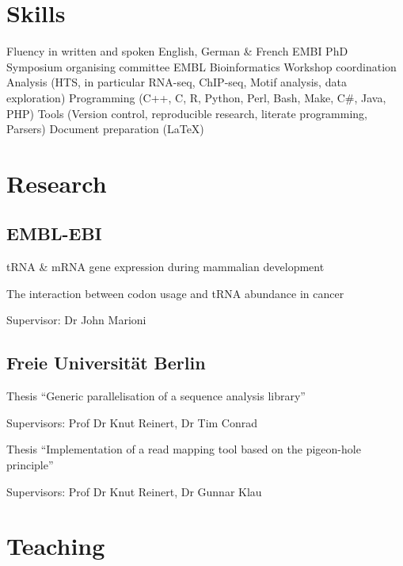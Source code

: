 \documentclass{klmr-cv}
\newcommand*\csharp{C\#}
\newcommand*\cpp{C++}
\begin{document}
\section{Skills}

\begin{itemize}
    \listitem Fluency in written and spoken English, German \& French
    \listitem EMBI PhD Symposium organising committee
    \listitem EMBL Bioinformatics Workshop coordination
    \listitem Analysis (HTS, in particular RNA-seq, ChIP-seq, Motif analysis,
        data exploration)
    \listitem Programming (\cpp, C, R, Python, Perl, Bash, Make, \csharp, Java, PHP)
    \listitem Tools (Version control, reproducible research, literate
        programming, Parsers)
    \listitem Document preparation (\LaTeX)
\end{itemize}

\body

\section{Research}

\subsection{EMBL-EBI}

\date{2011--2014}
\item{tRNA \& mRNA gene expression during mammalian development}
\date{2014--2015}
\item{The interaction between codon usage and tRNA abundance in cancer}
\item{Supervisor: Dr John Marioni}

\subsection{Freie Universität Berlin}

\date{2010--2011}
\item{Thesis “Generic parallelisation of a sequence analysis library”}
\item{Supervisors: Prof Dr Knut Reinert, Dr Tim Conrad}
\date{2008}
\item{Thesis “Implementation of a read mapping tool based on the pigeon-hole
    principle”}
\item{Supervisors: Prof Dr Knut Reinert, Dr Gunnar Klau}

\section{Teaching}
\end{document}
